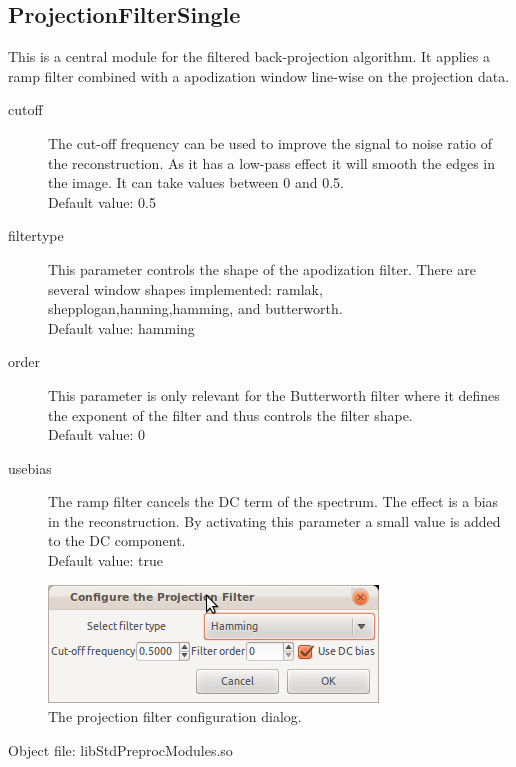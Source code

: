 \documentclass[a4paper]{scrreprt}
\begin{document}
\subsection{ProjectionFilterSingle}
This is a central module for the filtered back-projection algorithm. It applies
a ramp filter combined with a apodization window line-wise on the projection
data.
\begin{description}
 \item[cutoff] The cut-off frequency can be used to improve the signal to
noise ratio of the reconstruction. As it has a low-pass effect it will smooth
the edges in the image. It can take values between 0 and 0.5. \\Default
value: 0.5
 \item[filtertype] This parameter controls the shape of the apodization
filter. There are several window shapes implemented: ramlak,
shepplogan,hanning,hamming, and butterworth. \\Default value: hamming
 \item[order] This parameter is only relevant for the Butterworth filter where
it defines the exponent of the filter and thus controls the filter shape. \\
Default value: 0
 \item[usebias] The ramp filter cancels the DC term of the spectrum.
The effect is a bias in the reconstruction. By activating this
parameter a small value is added to the DC component.\\Default value: true
\end{description}
\begin{figure}[ht!]
\centering
\includegraphics[scale=0.5]{figures/ConfProjFilter.png}
\caption{The projection filter configuration dialog.}
\end{figure}
Object file: libStdPreprocModules.so
\end{document}
